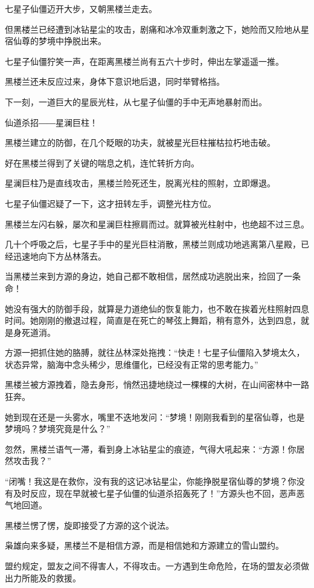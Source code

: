 \begin{this_body}
七星子仙僵迈开大步，又朝黑楼兰走去。

但黑楼兰已经遭到冰钻星尘的攻击，剧痛和冰冷双重刺激之下，她险而又险地从星宿仙尊的梦境中挣脱出来。

七星子仙僵狞笑一声，在距离黑楼兰尚有五六十步时，伸出左掌遥遥一推。

黑楼兰还未反应过来，身体下意识地后退，同时举臂格挡。

下一刻，一道巨大的星辰光柱，从七星子仙僵的手中无声地暴射而出。

仙道杀招――星澜巨柱！

黑楼兰建立的防御，在几个眨眼的功夫，就被星光巨柱摧枯拉朽地击破。

好在黑楼兰得到了关键的喘息之机，连忙转折方向。

星澜巨柱乃是直线攻击，黑楼兰险死还生，脱离光柱的照射，立即爆退。

七星子仙僵迟疑了一下，这才扭转左手，调整光柱方位。

黑楼兰左闪右躲，屡次和星澜巨柱擦肩而过。就算被光柱射中，也绝超不过三息。

几十个呼吸之后，七星子手中的星光巨柱消散，黑楼兰则成功地逃离第八星殿，已经迅速地向下方丛林落去。

当黑楼兰来到方源的身边，她自己都不敢相信，居然成功逃脱出来，捡回了一条命！

她没有强大的防御手段，就算是力道绝仙的恢复能力，也不敢在挨着光柱照射四息时间。她刚刚的撤退过程，简直是在死亡的琴弦上舞蹈，稍有意外，达到四息，就是身死道消。

方源一把抓住她的胳膊，就往丛林深处拖拽：“快走！七星子仙僵陷入梦境太久，状态异常，脑海中念头稀少，思维僵化，已经没有正常的思考能力。”

黑楼兰被方源拽着，隐去身形，悄然迅捷地绕过一棵棵的大树，在山间密林中一路狂奔。

她到现在还是一头雾水，嘴里不迭地发问：“梦境！刚刚我看到的星宿仙尊，也是梦境吗？梦境究竟是什么？”

忽然，黑楼兰语气一滞，看到身上冰钻星尘的痕迹，气得大吼起来：“方源！你居然攻击我？”

“闭嘴！我这是在救你，没有我的这记冰钻星尘，你能挣脱星宿仙尊的梦境？你没有及时反应，现在早就被七星子仙僵的仙道杀招轰死了！”方源头也不回，恶声恶气地回道。

黑楼兰愣了愣，旋即接受了方源的这个说法。

枭雄向来多疑，黑楼兰不是相信方源，而是相信她和方源建立的雪山盟约。

盟约规定，盟友之间不得害人，不得攻击。一方遇到生命危险，在场的盟友必须做出力所能及的救援。


\end{this_body}
